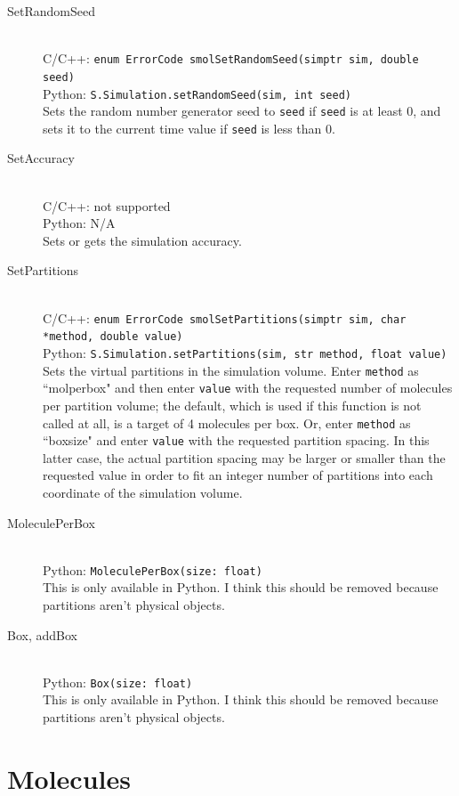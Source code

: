 \documentclass {scrbook}
\newcommand {\ttt} {\texttt}
\begin{document}
\begin{description}
\item[SetRandomSeed]
\hfill \\
C/C++: \ttt{enum ErrorCode smolSetRandomSeed(simptr sim, double seed)}\\
Python: \ttt{S.Simulation.setRandomSeed(sim, int seed)}\\
Sets the random number generator seed to \ttt{seed} if \ttt{seed} is at least 0, and sets it to the current time value if \ttt{seed} is less than 0.

\item[SetAccuracy]
\hfill \\
C/C++: not supported\\
Python: N/A\\
Sets or gets the simulation accuracy.

\item[SetPartitions]
\hfill \\
C/C++: \ttt{enum ErrorCode smolSetPartitions(simptr sim, char *method, double value)}\\
Python: \ttt{S.Simulation.setPartitions(sim, str method, float value)}\\
Sets the virtual partitions in the simulation volume. Enter \ttt{method} as ``molperbox" and then enter \ttt{value} with the requested number of molecules per partition volume; the default, which is used if this function is not called at all, is a target of 4 molecules per box. Or, enter \ttt{method} as ``boxsize" and enter \ttt{value} with the requested partition spacing. In this latter case, the actual partition spacing may be larger or smaller than the requested value in order to fit an integer number of partitions into each coordinate of the simulation volume.

\item[MoleculePerBox]
\hfill \\
Python: \ttt{MoleculePerBox(size: float)}\\
This is only available in Python. I think this should be removed because partitions aren't physical objects.

\item[Box, addBox]
\hfill \\
Python: \ttt{Box(size: float)}\\
This is only available in Python. I think this should be removed because partitions aren't physical objects.

\end{description}

\section{Molecules}
\end{document}
